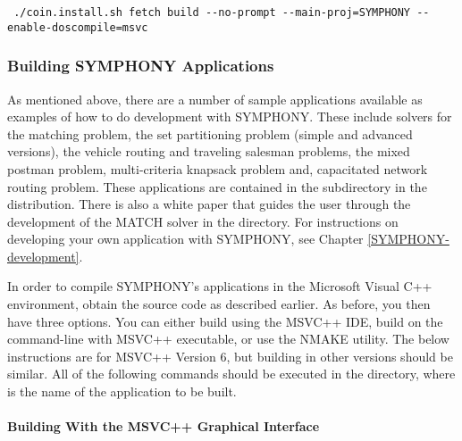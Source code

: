 {\color{Brown}
\begin{verbatim}
 ./coin.install.sh fetch build --no-prompt --main-proj=SYMPHONY --enable-doscompile=msvc
\end{verbatim}}

\subsubsection{Building SYMPHONY Applications}
\label{build_appl_msvc}

As mentioned above, there are a number of sample applications available as
examples of how to do development with SYMPHONY. These include solvers for the
matching problem, the set partitioning problem (simple and advanced versions),
the vehicle routing and traveling salesman problems, the mixed postman
problem, multi-criteria knapsack problem and, capacitated network routing
problem. These applications are contained in the 
subdirectory in the distribution. There is also a white paper that guides the
user through the development of the MATCH solver in the 
directory. For instructions on developing your own application with SYMPHONY,
see Chapter \ref{SYMPHONY-development}.

In order to compile SYMPHONY's applications in the Microsoft Visual C++
environment, obtain the source code as described earlier. As before, you then
have three options. You can either build using the MSVC++ IDE, build on the
command-line with MSVC++ executable, or use the NMAKE utility. The below
instructions are for MSVC++ Version 6, but building in other versions should
be similar. All of the following commands should be executed in the
 directory,
where  is the name of the application to be built.

\paragraph{Building With the MSVC++ Graphical Interface}

